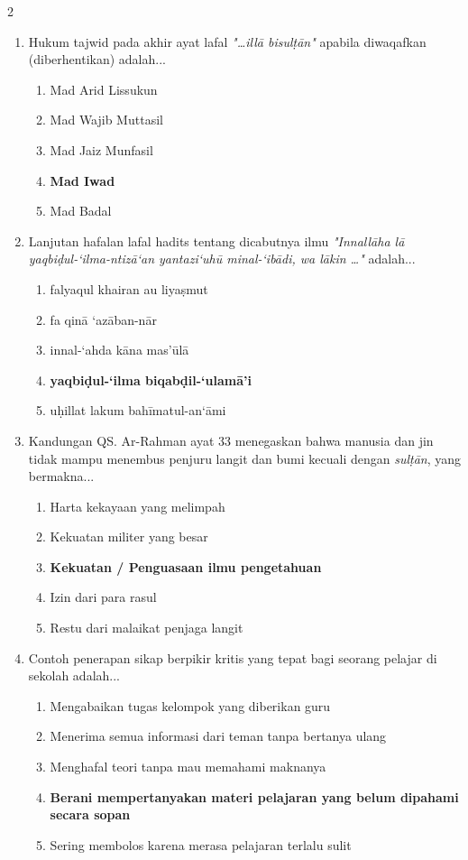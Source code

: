 \documentclass[10pt,a4paper]{article}
\begin{document}
\begin{multicols}{2}
\begin{enumerate}
    \item Hukum tajwid pada akhir ayat lafal \textit{"\dots illā bisulṭān"} apabila diwaqafkan (diberhentikan) adalah...
    \begin{enumerate}
      \item Mad Arid Lissukun
      \item Mad Wajib Muttasil
      \item Mad Jaiz Munfasil
      \item \textbf{Mad Iwad}
      \item Mad Badal
    \end{enumerate}

    \item Lanjutan hafalan lafal hadits tentang dicabutnya ilmu \textit{"Innallāha lā yaqbiḍul-‘ilma-ntizā‘an yantazi‘uhū minal-‘ibādi, wa lākin \dots"} adalah...
    \begin{enumerate}
      \item falyaqul khairan au liyaṣmut
      \item fa qinā ‘azāban-nār
      \item innal-‘ahda kāna mas’ūlā
      \item \textbf{yaqbiḍul-‘ilma biqabḍil-‘ulamā’i}
      \item uḥillat lakum bahīmatul-an‘āmi
    \end{enumerate}

    \item Kandungan QS. Ar-Rahman ayat 33 menegaskan bahwa manusia dan jin tidak mampu menembus penjuru langit dan bumi kecuali dengan \textit{sulṭān}, yang bermakna...
    \begin{enumerate}
      \item Harta kekayaan yang melimpah
      \item Kekuatan militer yang besar
      \item \textbf{Kekuatan / Penguasaan ilmu pengetahuan}
      \item Izin dari para rasul
      \item Restu dari malaikat penjaga langit
    \end{enumerate}

    \item Contoh penerapan sikap berpikir kritis yang tepat bagi seorang pelajar di sekolah adalah...
    \begin{enumerate}
      \item Mengabaikan tugas kelompok yang diberikan guru
      \item Menerima semua informasi dari teman tanpa bertanya ulang
      \item Menghafal teori tanpa mau memahami maknanya
      \item \textbf{Berani mempertanyakan materi pelajaran yang belum dipahami secara sopan}
      \item Sering membolos karena merasa pelajaran terlalu sulit
    \end{enumerate}


\end{enumerate}
\end{multicols}
\end{document}

